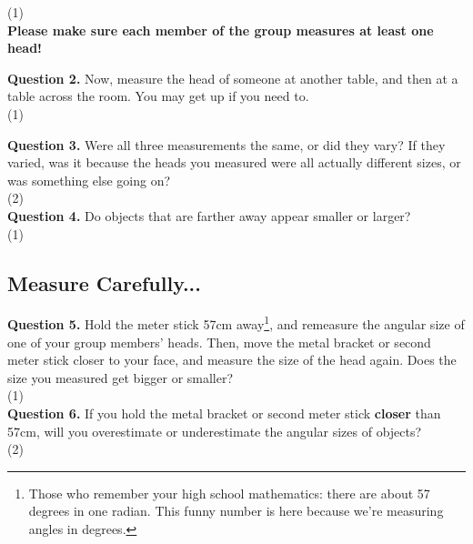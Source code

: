 \documentclass[11pt]{article}
\begin{document}
\vspace*{1.5cm}
(1) \hrulefill\\
\textbf{Please make sure each member of the group measures at least one head!}

\textbf{Question 2.} Now, measure the head of someone at another table, and then at a table across the room. You may get up if you need to.\\

\vspace{1.5cm}
(1) \hrulefill

\newpage

\textbf{Question 3.} Were all three measurements the same, or did they vary? If they varied, was it because the heads you measured were all actually different sizes, or was something else going on?\\

\vspace{1.5cm}
(2) \hrulefill\\

\textbf{Question 4.} Do objects that are farther away appear smaller or larger?\\

\vspace{1.5cm}
(1) \hrulefill\\

\subsection{Measure Carefully...}

\textbf{Question 5.} Hold the meter stick 57cm away\footnote{Those who remember your high school mathematics: there are about 57 degrees in one radian. This funny number is here because we're measuring angles in degrees.}, and remeasure the angular size of one of your group members' heads. Then, move the metal bracket or second meter stick closer to your face, and measure the size of the head again. Does the size you measured get bigger or smaller?\\ 

\vspace{1.5cm}
(1) \hrulefill\\

\textbf{Question 6.} If you hold the metal bracket or second meter stick \textbf{closer} than 57cm, will you overestimate or underestimate the angular sizes of objects?\\

\vspace{1.5cm}
(2) \hrulefill
\end{document}

